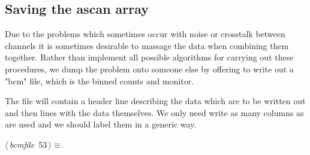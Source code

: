 \documentclass[10pt,a4paper,notitlepage]{article}
\begin{document}
\subsection{Saving the ascan array}
Due to the problems which sometimes occur with noise or crosstalk between
channels it is sometimes desirable to massage the data when combining
them together. Rather than implement all possible algorithms for 
carrying out these procedures, we dump the problem onto someone else
by offering to write out a "bcm" file, which is the binned counts and monitor.

The file will contain a header line describing the data which are to be
written out and then lines with the data themselves. We only need write
as many columns as are used and we should label them in a generic way.

\begin{flushleft} \small
\begin{minipage}{\linewidth}\label{scrap56}\raggedright\small
{} $\langle\,${\it bcmfile}\nobreak\ {\footnotesize {53}}$\,\rangle\equiv$
\vspace{-1ex}
\end{minipage}
\end{flushleft}
\end{document}
